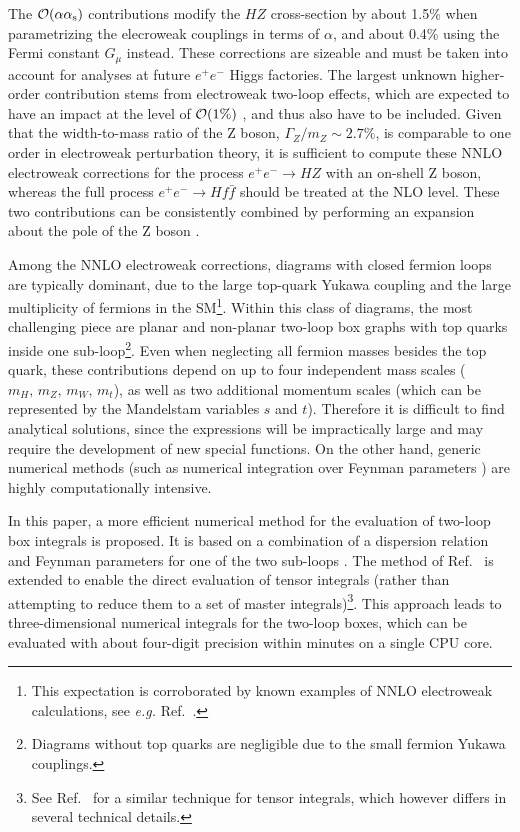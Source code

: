 \documentclass[12pt]{article}
\newcommand{\as}{\alpha_{\mathrm s}}
\begin{document}
The ${\cal O}(\alpha\as)$ contributions modify the $HZ$ cross-section by about
1.5\% when parametrizing the elecroweak couplings in terms of $\alpha$, and
about 0.4\% using the Fermi constant $G_\mu$ instead. These corrections are
sizeable and must be taken into account for analyses at future $e^+e^-$ Higgs
factories. The largest unknown higher-order contribution stems from electroweak
two-loop effects, which are expected to have an impact at the level of ${\cal
O}(1\%)$ \cite{therr}, and thus also have to be included. Given that the
width-to-mass ratio of the Z boson, $\Gamma_Z/m_Z \sim 2.7\%$, is comparable to
one order in electroweak perturbation theory, it is sufficient to compute these
NNLO electroweak corrections for the process $e^+e^- \to HZ$ with an on-shell
Z boson, whereas the full process $e^+e^- \to Hf\bar{f}$ should be
treated at the NLO level. These two contributions can be consistently
combined by performing an expansion about the pole of the Z boson \cite{zpole}.

Among the NNLO electroweak corrections, diagrams with closed fermion loops are 
typically dominant, due to the large top-quark Yukawa coupling and the large
multiplicity of fermions in the SM\footnote{This expectation is corroborated by
known examples of NNLO electroweak calculations, see \emph{e.g.}
Ref.~\cite{Dubovyk:2019szj}.}. Within this class of diagrams, the most
challenging piece are planar and non-planar two-loop box graphs with top quarks
inside one sub-loop\footnote{Diagrams without top quarks are negligible due to
the small fermion Yukawa couplings.}. Even when neglecting
all fermion masses besides the top quark, these contributions depend on up to
four independent mass scales ($m_H,\,m_Z,\,m_W,\,m_t$), as well as two
additional momentum scales (which can be represented by the Mandelstam variables
$s$ and $t$). Therefore it is difficult to find analytical solutions,
since the expressions will be impractically large and may require the
development of new special functions. On the other hand, generic numerical methods (such
as numerical integration over Feynman parameters \cite{Yuasa:2011ff}) are
highly computationally intensive. 

In this paper, a more efficient numerical method for the evaluation of two-loop
box integrals is proposed. It is based on a combination of a dispersion relation
and Feynman parameters for one of the two sub-loops \cite{Awramik:2006uz}. The
method of Ref.~\cite{Awramik:2006uz} is extended to enable the direct evaluation
of tensor integrals (rather than attempting to reduce them to a set of master
integrals)\footnote{See Ref.~\cite{Aleksejevs:2018tfr} for a similar technique
for tensor integrals, which however differs in several technical
details.}.  This approach leads to three-dimensional numerical integrals for the
two-loop boxes, which can be evaluated with about four-digit precision within
minutes on a single CPU core.
\end{document}
